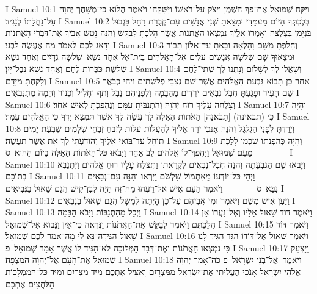 I Samuel 10:1	וַיִּקַּח שְׁמוּאֵל אֶת־פַּךְ הַשֶּׁמֶן וַיִּצֹק עַל־רֹאשׁוֹ וַיִּשָּׁקֵהוּ וַיֹּאמֶר הֲלוֹא כִּי־מְשָׁחֲךָ יְהֹוָה עַל־נַחֲלָתוֹ לְנָגִיד׃
I Samuel 10:2	בְּלֶכְתְּךָ הַיּוֹם מֵעִמָּדִי וּמָצָאתָ שְׁנֵי אֲנָשִׁים עִם־קְבֻרַת רָחֵל בִּגְבוּל בִּנְיָמִן בְּצֶלְצַח וְאָמְרוּ אֵלֶיךָ נִמְצְאוּ הָאֲתֹנוֹת אֲשֶׁר הָלַכְתָּ לְבַקֵּשׁ וְהִנֵּה נָטַשׁ אָבִיךָ אֶת־דִּבְרֵי הָאֲתֹנוֹת וְדָאַג לָכֶם לֵאמֹר מָה אֶעֱשֶׂה לִבְנִי׃
I Samuel 10:3	וְחָלַפְתָּ מִשָּׁם וָהָלְאָה וּבָאתָ עַד־אֵלוֹן תָּבוֹר וּמְצָאוּךָ שָּׁם שְׁלֹשָׁה אֲנָשִׁים עֹלִים אֶל־הָאֱלֹהִים בֵּית־אֵל אֶחָד נֹשֵׂא  שְׁלֹשָׁה גְדָיִים וְאֶחָד נֹשֵׂא שְׁלֹשֶׁת כִּכְּרוֹת לֶחֶם וְאֶחָד נֹשֵׂא נֵבֶל־יָיִן׃
I Samuel 10:4	וְשָׁאֲלוּ לְךָ לְשָׁלוֹם וְנָתְנוּ לְךָ שְׁתֵּי־לֶחֶם וְלָקַחְתָּ מִיָּדָם׃
I Samuel 10:5	אַחַר כֵּן תָּבוֹא גִּבְעַת הָאֱלֹהִים אֲשֶׁר־שָׁם נְצִבֵי פְלִשְׁתִּים וִיהִי כְבֹאֲךָ שָׁם הָעִיר וּפָגַעְתָּ חֶבֶל נְבִאִים יֹרְדִים מֵהַבָּמָה וְלִפְנֵיהֶם נֵבֶל וְתֹף וְחָלִיל וְכִנּוֹר וְהֵמָּה מִתְנַבְּאִים׃
I Samuel 10:6	וְצָלְחָה עָלֶיךָ רוּחַ יְהֹוָה וְהִתְנַבִּיתָ עִמָּם וְנֶהְפַּכְתָּ לְאִישׁ אַחֵר׃
I Samuel 10:7	וְהָיָה כִּי (תבאינה) [תָבֹאנָה] הָאֹתוֹת הָאֵלֶּה לָךְ עֲשֵׂה לְךָ אֲשֶׁר תִּמְצָא יָדֶךָ כִּי הָאֱלֹהִים עִמָּךְ׃
I Samuel 10:8	וְיָרַדְתָּ לְפָנַי הַגִּלְגָּל וְהִנֵּה אָנֹכִי יֹרֵד אֵלֶיךָ לְהַעֲלוֹת עֹלוֹת לִזְבֹּחַ זִבְחֵי שְׁלָמִים שִׁבְעַת יָמִים תּוֹחֵל עַד־בּוֹאִי אֵלֶיךָ וְהוֹדַעְתִּי לְךָ אֵת אֲשֶׁר תַּעֲשֶׂה׃
I Samuel 10:9	וְהָיָה כְּהַפְנֹתוֹ שִׁכְמוֹ לָלֶכֶת מֵעִם שְׁמוּאֵל וַיַּהֲפךְ־לוֹ אֱלֹהִים לֵב אַחֵר וַיָּבֹאוּ כּל־הָאֹתוֹת הָאֵלֶּה בַּיּוֹם הַהוּא׃ {ס}        
I Samuel 10:10	וַיָּבֹאוּ שָׁם הַגִּבְעָתָה וְהִנֵּה חֶבֶל־נְבִאִים לִקְרָאתוֹ וַתִּצְלַח עָלָיו רוּחַ אֱלֹהִים וַיִּתְנַבֵּא בְּתוֹכָם׃
I Samuel 10:11	וַיְהִי כּל־יוֹדְעוֹ מֵאִתְּמוֹל שִׁלְשֹׁם וַיִּרְאוּ וְהִנֵּה עִם־נְבִאִים נִבָּא {ס}        וַיֹּאמֶר הָעָם אִישׁ אֶל־רֵעֵהוּ מַה־זֶּה הָיָה לְבֶן־קִישׁ הֲגַם שָׁאוּל בַּנְּבִיאִים׃
I Samuel 10:12	וַיַּעַן אִישׁ מִשָּׁם וַיֹּאמֶר וּמִי אֲבִיהֶם עַל־כֵּן הָיְתָה לְמָשָׁל הֲגַם שָׁאוּל בַּנְּבִאִים׃
I Samuel 10:13	וַיְכַל מֵהִתְנַבּוֹת וַיָּבֹא הַבָּמָה׃
I Samuel 10:14	וַיֹּאמֶר דּוֹד שָׁאוּל אֵלָיו וְאֶל־נַעֲרוֹ אָן הֲלַכְתֶּם וַיֹּאמֶר לְבַקֵּשׁ אֶת־הָאֲתֹנוֹת וַנִּרְאֶה כִי־אַיִן וַנָּבוֹא אֶל־שְׁמוּאֵל׃
I Samuel 10:15	וַיֹּאמֶר דּוֹד שָׁאוּל הַגִּידָה־נָּא לִי מָה־אָמַר לָכֶם שְׁמוּאֵל׃
I Samuel 10:16	וַיֹּאמֶר שָׁאוּל אֶל־דּוֹדוֹ הַגֵּד הִגִּיד לָנוּ כִּי נִמְצְאוּ הָאֲתֹנוֹת וְאֶת־דְּבַר הַמְּלוּכָה לֹא־הִגִּיד לוֹ אֲשֶׁר אָמַר שְׁמוּאֵל׃ {פ}
I Samuel 10:17	וַיַּצְעֵק שְׁמוּאֵל אֶת־הָעָם אֶל־יְהֹוָה הַמִּצְפָּה׃
I Samuel 10:18	וַיֹּאמֶר  אֶל־בְּנֵי יִשְׂרָאֵל {פ} כֹּה־אָמַר יְהֹוָה אֱלֹהֵי יִשְׂרָאֵל אָנֹכִי הֶעֱלֵיתִי אֶת־יִשְׂרָאֵל מִמִּצְרָיִם וָאַצִּיל אֶתְכֶם מִיַּד מִצְרַיִם וּמִיַּד כּל־הַמַּמְלָכוֹת הַלֹּחֲצִים אֶתְכֶם׃
